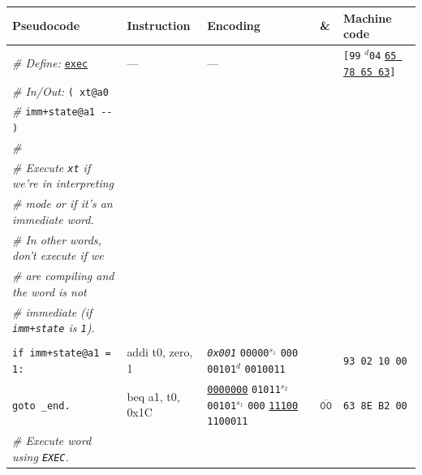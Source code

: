 \documentclass[a4paper,12pt,final]{article}
\begin{document}
\begin{table}[!htbp]
\begin{adjustwidth}{-1cm}{-1cm}
\begin{center}
\end{center}
\normalsize \end{adjustwidth} \end{table} \vspace{0}

\begin{table}[!htbp] \begin{adjustwidth}{-1cm}{-1cm} \fontsize{8}{9.600000}\selectfont
\begin{center}
\begin{tabular}{l|ll|l|l}
\textbf{Pseudocode} & \textbf{Instruction} & \textbf{Encoding} & \textbf{\&} & \textbf{Machine code}\\[0pt]
\hline
\emph{\# Define:} \uline{\texttt{exec}} & --- & --- &  & \texttt{[99} \(^{d}\)​\texttt{04} \uline{\texttt{65 78 65 63}}​\texttt{]}\\[0pt]
\emph{\# In/Out:} \texttt{( xt@a0} &  &  &  & \\[0pt]
\emph{\#}\hspace{4.9em}   \texttt{imm+state@a1 -{}-{} )} &  &  &  & \\[0pt]
\emph{\#} &  &  &  & \\[0pt]
\emph{\# Execute \texttt{xt} if we're in interpreting} &  &  &  & \\[0pt]
\emph{\# mode or if it's an immediate word.} &  &  &  & \\[0pt]
\emph{\# In other words, don't execute if we} &  &  &  & \\[0pt]
\emph{\# are compiling and the word is not} &  &  &  & \\[0pt]
\emph{\# immediate (if \texttt{imm+state} is \texttt{1}).} &  &  &  & \\[0pt]
 &  &  &  & \\[0pt]
\hspace{1.053000em} \texttt{if imm+state@a1 = 1:} & addi t0, zero, 1 & \emph{\texttt{0x001}}                    \texttt{00000}​\(^{s_{1}}\) \texttt{000} \texttt{00101}​\(^{d}\)  \texttt{0010011} &  & \texttt{93 02 10 00}\\[0pt]
\hspace{2.106000em}   \texttt{goto \_end.} & beq a1, t0, 0x1C & \uline{\texttt{0000000}} \texttt{01011}​\(^{s_{2}}\) \texttt{00101}​\(^{s_{1}}\) \texttt{000} \uline{\texttt{11100}} \texttt{1100011} & \(\overline{\texttt{00}}\) & \texttt{63 8E B2 00}\\[0pt]
\hspace{1.053000em} \emph{\# Execute word using \texttt{EXEC}.} &  &  &  & \\[0pt]

\end{tabular}
\end{center}
\end{adjustwidth}
\end{table}
\end{document}
